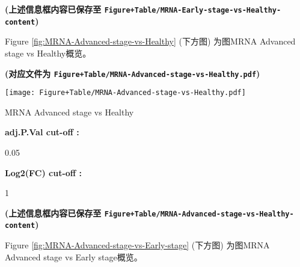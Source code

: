 \documentclass[
]{article}
\begin{document}
\textbf{(上述信息框内容已保存至 \texttt{Figure+Table/MRNA-Early-stage-vs-Healthy-content})}

\begin{center}\vspace{1.5cm}\end{center}

Figure \ref{fig:MRNA-Advanced-stage-vs-Healthy} (下方图) 为图MRNA Advanced stage vs Healthy概览。

\textbf{(对应文件为 \texttt{Figure+Table/MRNA-Advanced-stage-vs-Healthy.pdf})}

\def\@captype{figure}
\begin{center}
\texttt{[image: Figure+Table/MRNA-Advanced-stage-vs-Healthy.pdf]}
\caption{MRNA Advanced stage vs Healthy}\label{fig:MRNA-Advanced-stage-vs-Healthy}
\end{center}

\begin{center}\vspace{1.5cm}\end{center}\begin{center}\begin{tcolorbox}[colback=gray!10, colframe=gray!50, width=0.9\linewidth, arc=1mm, boxrule=0.5pt]
\textbf{
adj.P.Val cut-off
:}

\vspace{0.5em}

    0.05

\vspace{2em}


\textbf{
Log2(FC) cut-off
:}

\vspace{0.5em}

    1

\vspace{2em}
\end{tcolorbox}
\end{center}

\textbf{(上述信息框内容已保存至 \texttt{Figure+Table/MRNA-Advanced-stage-vs-Healthy-content})}

\begin{center}\vspace{1.5cm}\end{center}

Figure \ref{fig:MRNA-Advanced-stage-vs-Early-stage} (下方图) 为图MRNA Advanced stage vs Early stage概览。
\end{document}
